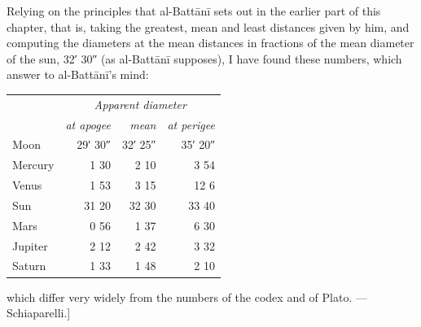 \documentclass[11pt]{article}
\begin{document}
\par Relying on the principles that al-Battānī sets out in the earlier part of this chapter, that is, taking the greatest, mean and least distances given by him, and computing the diameters at the mean distances in fractions of the mean diameter of the sun, 32′ 30″ (as al-Battānī supposes), I have found these numbers, which answer to al-Battānī's mind:\par
\begin{center}\small\begin{tabular}{lrrr}
 & \multicolumn{3}{c}{\emph{Apparent diameter}} \\
 & \emph{at apogee} & \emph{mean} & \emph{at perigee} \\
\midrule
Moon & 29′ 30″ & 32′ 25″ & 35′ 20″ \\
Mercury & 1 30 & 2 10 & 3 54 \\
Venus & 1 53 & 3 15 & 12 6 \\
Sun & 31 20 & 32 30 & 33 40 \\
Mars & 0 56 & 1 37 & 6 30 \\
Jupiter & 2 12 & 2 42 & 3 32 \\
Saturn & 1 33 & 1 48 & 2 10 \\
\end{tabular}\end{center}
\par which differ very widely from the numbers of the codex and of Plato. — Schiaparelli.]\par
\end{document}
